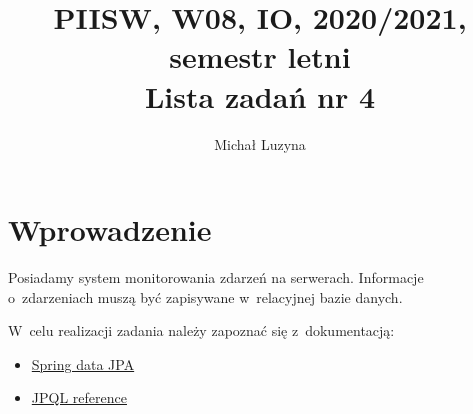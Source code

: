 \documentclass[12pt]{article}
\title{PIISW, W08, IO, 2020/2021, semestr letni\\Lista zadań nr 4}
\author{Michał Luzyna}
\begin{document}
    \maketitle

    \section*{Wprowadzenie}
        Posiadamy system monitorowania zdarzeń na serwerach. Informacje o~zdarzeniach muszą być zapisywane w~relacyjnej bazie danych.

        W~celu realizacji zadania należy zapoznać się z~dokumentacją:
        \begin{itemize}
            \item \href{https://docs.spring.io/spring-data/jpa/docs/current/reference/html/}{Spring data JPA}
            \item \href{https://docs.oracle.com/javaee/6/tutorial/doc/bnbuf.html}{JPQL reference}
        \end{itemize}
\end{document}
